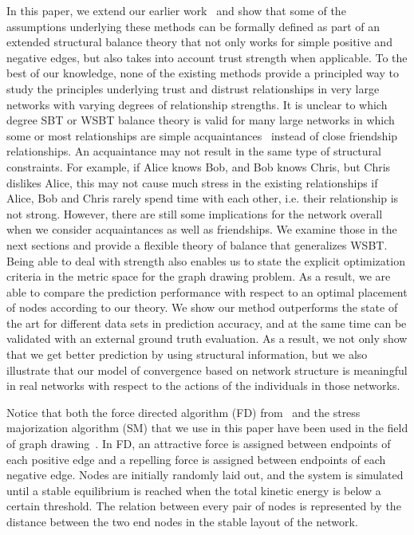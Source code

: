 \documentclass[acmtweb]{acmsmall}
\begin{document}
In this paper, we extend our earlier work~\cite{QA2013} and show that
some of the assumptions underlying these methods can be formally
defined as part of an extended structural balance theory that not only
works for simple positive and negative edges, but also takes into
account trust strength when applicable.  To the best of our knowledge,
none of the existing methods provide a principled way to study the
principles underlying trust and distrust relationships in very large
networks with varying degrees of relationship strengths. It is unclear
to which degree SBT or WSBT balance theory is valid for many large
networks in which some or most relationships are simple
acquaintances~\cite{Granovetter:1973} instead of close friendship
relationships. An acquaintance may not result in the same type of
structural constraints. For example, if Alice knows Bob, and Bob knows
Chris, but Chris dislikes Alice, this may not cause much stress in the
existing relationships if Alice, Bob and Chris rarely spend time with
each other, i.e. their relationship is not strong. However, there are
still some implications for the network overall when we consider
acquaintances as well as friendships. We examine those in the next
sections and provide a flexible theory of balance that generalizes
WSBT.  Being able to deal with strength also enables us to state the
explicit optimization criteria in the metric space for the graph
drawing problem. As a result, we are able to compare the prediction
performance with respect to an optimal placement of nodes according to
our theory. We show our method outperforms the state of the art for
different data sets in prediction accuracy, and at the same time can
be validated with an external ground truth evaluation. As a result, we
not only show that we get better prediction by using structural
information, but we also illustrate that our model of convergence
based on network structure is meaningful in real networks with respect
to the actions of the individuals in those networks.

Notice that both the force directed algorithm (FD)
from~\cite{golbeck:distrust2011} and the stress majorization algorithm
(SM) that we use in this paper have been used in the field of graph
drawing~\cite{Gansner:05}. In FD, an attractive force is assigned
between endpoints of each positive edge and a repelling force is
assigned between endpoints of each negative edge. Nodes are initially
randomly laid out, and the system is simulated until a stable
equilibrium is reached when the total kinetic energy is below a certain
threshold. The relation between every pair of nodes is represented by
the distance between the two end nodes in the stable layout of the
network. 
\end{document}
